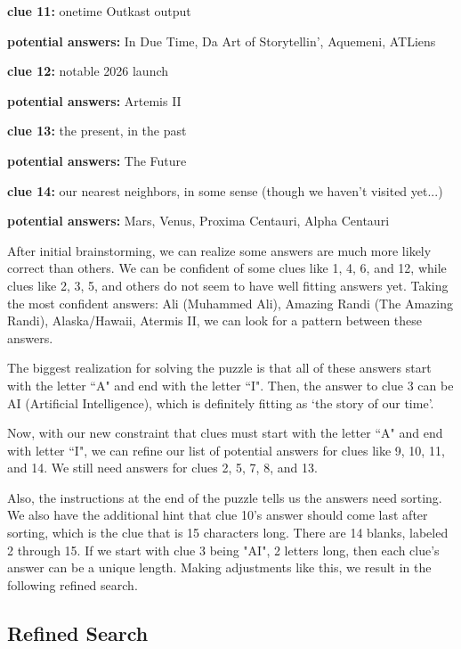 \documentclass{article}
\begin{document}
\quad

\textbf{clue 11: } onetime Outkast output

\quad\textbf{potential answers:} In Due Time, Da Art of Storytellin', Aquemeni, ATLiens 

\quad

\textbf{clue 12: } notable 2026 launch

\quad\textbf{potential answers:} Artemis II

\quad

\textbf{clue 13: } the present, in the past

\quad\textbf{potential answers:} The Future

\quad

\textbf{clue 14: } our nearest neighbors, in some sense (though we haven't visited yet...) 

\quad\textbf{potential answers:} Mars, Venus, Proxima Centauri, Alpha Centauri

\quad 

After initial brainstorming, we can realize some answers are much more likely correct than others. We can be confident of some clues like 1, 4, 6, and 12, while clues like 2, 3, 5, and others do not seem to have well fitting answers yet. Taking the most confident answers: Ali (Muhammed Ali), Amazing Randi (The Amazing Randi), Alaska/Hawaii, Atermis II, we can look for a pattern between these answers.

The biggest realization for solving the puzzle is that all of these answers start with the letter ``A" and end with the letter ``I". Then, the answer to clue 3 can be AI (Artificial Intelligence), which is definitely fitting as `the story of our time'.

Now, with our new constraint that clues must start with the letter ``A" and end with letter ``I", we can refine our list of potential answers for clues like 9, 10, 11, and 14. We still need answers for clues 2, 5, 7, 8, and 13. 

Also, the instructions at the end of the puzzle tells us the answers need sorting. We also have the additional hint that clue 10's answer should come last after sorting, which is the clue that is 15 characters long. There are 14 blanks, labeled 2 through 15. If we start with clue 3 being "AI", 2 letters long, then each clue's answer can be a unique length. Making adjustments like this, we result in the following refined search.

\subsection*{Refined Search}
\end{document}

